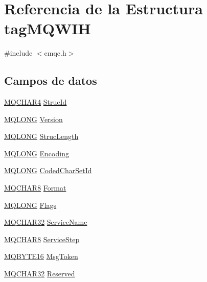\hypertarget{structtag_m_q_w_i_h}{}\section{Referencia de la Estructura tag\+M\+Q\+W\+I\+H}
\label{structtag_m_q_w_i_h}


{\ttfamily \#include $<$cmqc.\+h$>$}

\subsection*{Campos de datos}
\begin{DoxyCompactItemize}
\item 
\hyperlink{cmqc_8h_a12590e546ed66fda7cf21c1d5cefa31d}{M\+Q\+C\+H\+A\+R4} \hyperlink{structtag_m_q_w_i_h_a0530922ca944569b52601d74941f96e4}{Struc\+Id}
\item 
\hyperlink{cmqc_8h_a1fb8d28cbda3fa8766a9821230cdb6d5}{M\+Q\+L\+O\+N\+G} \hyperlink{structtag_m_q_w_i_h_a0656ef8f766b3907d394d88a35d7b7e9}{Version}
\item 
\hyperlink{cmqc_8h_a1fb8d28cbda3fa8766a9821230cdb6d5}{M\+Q\+L\+O\+N\+G} \hyperlink{structtag_m_q_w_i_h_a830af9a4a08c015b9a4b2d39d4d3420a}{Struc\+Length}
\item 
\hyperlink{cmqc_8h_a1fb8d28cbda3fa8766a9821230cdb6d5}{M\+Q\+L\+O\+N\+G} \hyperlink{structtag_m_q_w_i_h_a30167bf454a49a60fd3fe4e9e586af34}{Encoding}
\item 
\hyperlink{cmqc_8h_a1fb8d28cbda3fa8766a9821230cdb6d5}{M\+Q\+L\+O\+N\+G} \hyperlink{structtag_m_q_w_i_h_a4d8d1961a991850d1355cdf9b4680b8e}{Coded\+Char\+Set\+Id}
\item 
\hyperlink{cmqc_8h_abddcedb8c41fa262f2bd05dfec3e60a5}{M\+Q\+C\+H\+A\+R8} \hyperlink{structtag_m_q_w_i_h_a435a478822008713f8aaff89f369ed63}{Format}
\item 
\hyperlink{cmqc_8h_a1fb8d28cbda3fa8766a9821230cdb6d5}{M\+Q\+L\+O\+N\+G} \hyperlink{structtag_m_q_w_i_h_a8da770267273b200fa9c968fa2a0da57}{Flags}
\item 
\hyperlink{cmqc_8h_a0b7dd696f0148465fe80f6eae57b38a2}{M\+Q\+C\+H\+A\+R32} \hyperlink{structtag_m_q_w_i_h_abb17f696a4e8c5d156821d23b0f50e84}{Service\+Name}
\item 
\hyperlink{cmqc_8h_abddcedb8c41fa262f2bd05dfec3e60a5}{M\+Q\+C\+H\+A\+R8} \hyperlink{structtag_m_q_w_i_h_a6374b5b4fad2f2a335b40c1eb8d523dc}{Service\+Step}
\item 
\hyperlink{cmqc_8h_afe5ed2c1b7363c2d8f3c068787be6c5d}{M\+Q\+B\+Y\+T\+E16} \hyperlink{structtag_m_q_w_i_h_a7a9f6d7dcb4ca77398c126fa4101733d}{Msg\+Token}
\item 
\hyperlink{cmqc_8h_a0b7dd696f0148465fe80f6eae57b38a2}{M\+Q\+C\+H\+A\+R32} \hyperlink{structtag_m_q_w_i_h_a0b58bef81b9a04641b8939833aaa81ae}{Reserved}
\end{DoxyCompactItemize}


